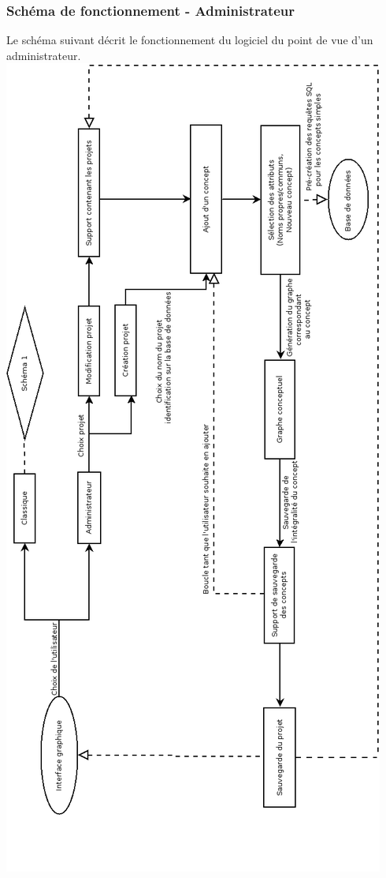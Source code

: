\documentclass[12pt]{report}
\begin{document}
	\subsubsection{Schéma de fonctionnement - Administrateur}
	Le schéma suivant décrit le fonctionnement du logiciel du point de vue d'un administrateur.
	\includegraphics[scale=0.45]{FonctionnementAdministrateur.png}
\end{document}
